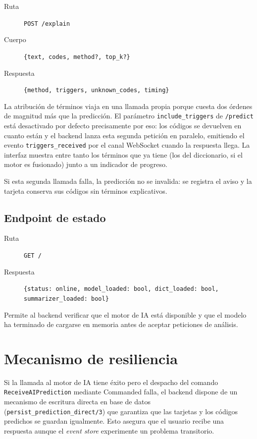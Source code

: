 \begin{description}
 \item[Ruta] \texttt{POST /explain}
 \item[Cuerpo] \texttt{\{text, codes, method?, top\_k?\}}
 \item[Respuesta] \texttt{\{method, triggers, unknown\_codes, timing\}}
\end{description}

La atribución de términos viaja en una llamada propia porque cuesta dos órdenes de magnitud más que la predicción. El parámetro \texttt{include\_triggers} de \texttt{/predict} está desactivado por defecto precisamente por eso: los códigos se devuelven en cuanto están y el backend lanza esta segunda petición en paralelo, emitiendo el evento \texttt{triggers\_received} por el canal WebSocket cuando la respuesta llega. La interfaz muestra entre tanto los términos que ya tiene (los del diccionario, si el motor es fusionado) junto a un indicador de progreso.

Si esta segunda llamada falla, la predicción no se invalida: se registra el aviso y la tarjeta conserva sus códigos sin términos explicativos.

\subsection{Endpoint de estado}

\begin{description}
 \item[Ruta] \texttt{GET /}
 \item[Respuesta] \texttt{\{status: \textquotedbl{}online\textquotedbl{}, model\_loaded: bool, dict\_loaded: bool, summarizer\_loaded: bool\}}
\end{description}

Permite al backend verificar que el motor de IA está disponible y que el modelo ha terminado de cargarse en memoria antes de aceptar peticiones de análisis.

\section{Mecanismo de resiliencia}

Si la llamada al motor de IA tiene éxito pero el despacho del comando \texttt{ReceiveAIPrediction} mediante Commanded falla, el backend dispone de un mecanismo de escritura directa en base de datos (\texttt{persist\_prediction\_direct/3}) que garantiza que las tarjetas y los códigos predichos se guardan igualmente. Esto asegura que el usuario recibe una respuesta aunque el \emph{event store} experimente un problema transitorio.
